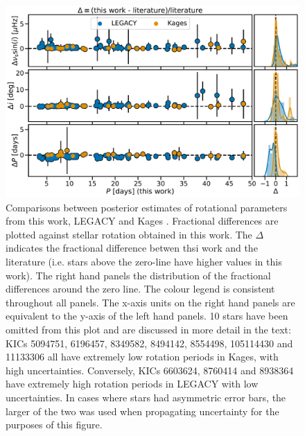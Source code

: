 \begin{figure}[h!]
	\centering
	\includegraphics[width=\textwidth]{Images/litcomp_alt2.pdf}
	\caption{Comparisons between posterior estimates of rotational parameters from this work, LEGACY and Kages \cite[private communication]{davies+2016, lund+2017}. Fractional differences are plotted against stellar rotation obtained in this work. The $\Delta$ indicates the fractional difference betwen thsi work and the literature (i.e. stars above the zero-line have higher values in this work). The right hand panels the distribution of the fractional differences around the zero line. The colour legend is consistent throughout all panels. The x-axis units on the right hand panels are equivalent to the y-axis of the left hand panels. 10 stars have been omitted from this plot and are discussed in more detail in the text: KICs 5094751, 6196457, 8349582, 8494142, 8554498, 105114430 and 11133306 all have extremely low rotation periods in Kages, with high uncertainties. Conversely, KICs 6603624, 8760414 and 8938364 have extremely high rotation periods in LEGACY with low uncertainties. In cases where stars had asymmetric error bars, the larger of the two was used when propagating uncertainty for the purposes of this figure.}
	\label{fig:legacykages}
\end{figure}
 
